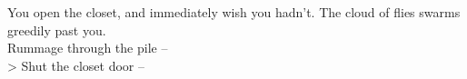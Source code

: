 You open the closet, and immediately wish you hadn’t. The cloud of flies swarms greedily past you.\\

 Rummage through the pile -- \\
> Shut the closet door -- 